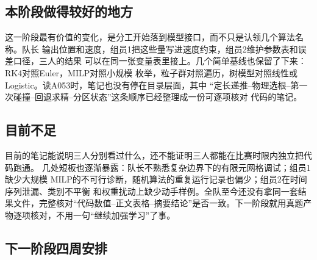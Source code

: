 \documentclass[UTF8,zihao=-4]{ctexart}
\begin{document}
\subsection{本阶段做得较好的地方}

这一阶段最有价值的变化，是分工开始落到模型接口，而不只是认领几个算法名称。队长
输出位置和速度，组员1把这些量写进速度约束，组员2维护参数表和误差口径，三人的结果
可以在同一张变量表里接上。几个简单基线也保留了下来：RK4对照Euler，MILP对照小规模
枚举，粒子群对照遍历，树模型对照线性或Logistic。读A053时，笔记也没有停在目录层面，其中
“定长递推--物理选根--第一次碰撞--回退求精--分区状态”这条顺序已经整理成一份可逐项核对
代码的笔记。

\subsection{目前不足}

目前的笔记能说明三人分别看过什么，还不能证明三人都能在比赛时限内独立把代码跑通。
几处短板也逐渐暴露：队长不熟悉复杂边界下的有限元网格调试；组员1缺少大规模
MILP的不可行诊断，随机算法的重复运行记录也偏少；组员2在时间序列泄漏、类别不平衡
和权重扰动上缺少动手样例。全队至今还没有拿同一套结果文件，完整核对“代码数值--正文表格--摘要结论”是否一致。下一阶段就用真题产物逐项核对，不用一句“继续加强学习”了事。

\subsection{下一阶段四周安排}
\end{document}
